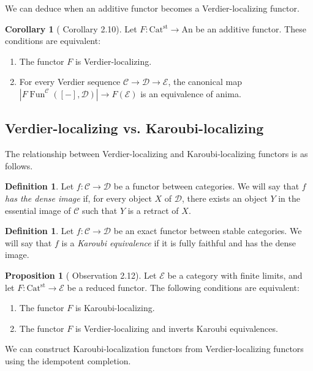 \documentclass[a4paper,dvipdfmx,11pt,reqno]{amsart}
\DeclareMathOperator{\Fun}{Fun}
\newcommand{\C}{\mathcal{C}}
\newcommand{\D}{\mathcal{D}}
\newcommand{\E}{\mathcal{E}}
\newcommand{\An}{\mathrm{An}}
\newcommand{\Catst}{\mathrm{Cat^{st}}}
\theoremstyle{definition}
\newtheorem{definition}[theorem]{Definition}
\newtheorem{corollary}[theorem]{Corollary}
\newtheorem{proposition}[theorem]{Proposition}
\begin{document}
We can deduce when an additive functor becomes a Verdier-localizing functor.

\begin{corollary}[\cite{HLS23} Corollary 2.10] \label{HLS23.cor.2.10}
  Let $F : \Catst \to \An$ be an additive functor.
  These conditions are equivalent:
  \begin{enumerate}
    \item The functor $F$ is Verdier-localizing.
    \item For every Verdier sequence $\C \to \D \to \E$, the canonical map $|F\Fun^{\C}([-],\D)| \to F(\E)$ is an equivalence of anima.
  \end{enumerate}
\end{corollary}

\subsection{Verdier-localizing vs. Karoubi-localizing}

The relationship between Verdier-localizing and Karoubi-localizing functors is as follows.

\begin{definition}
  Let $f : \C \to \D$ be a functor between categories.
  We will say that $f$ \textit{has the dense image} if, for every object $X$ of $\D$, there exists an object $Y$ in the essential image of $\C$ such that $Y$ is a retract of $X$. 
\end{definition}

\begin{definition}
  Let $f : \C \to \D$ be an exact functor between stable categories.
  We will say that $f$ is a \textit{Karoubi equivalence} if it is fully faithful and has the dense image.
\end{definition}

\begin{proposition}[\cite{HLS23} Observation 2.12] \label{HLS23.obs.2.12}
  Let $\E$ be a category with finite limits, and let $F : \Catst \to \E$ be a reduced functor.
  The following conditions are equivalent:
  \begin{enumerate}
    \item The functor $F$ is Karoubi-localizing.
    \item The functor $F$ is Verdier-localizing and inverts Karoubi equivalences.
  \end{enumerate}
\end{proposition}

We can construct Karoubi-localization functors from Verdier-localizing functors using the idempotent completion.
\end{document}
